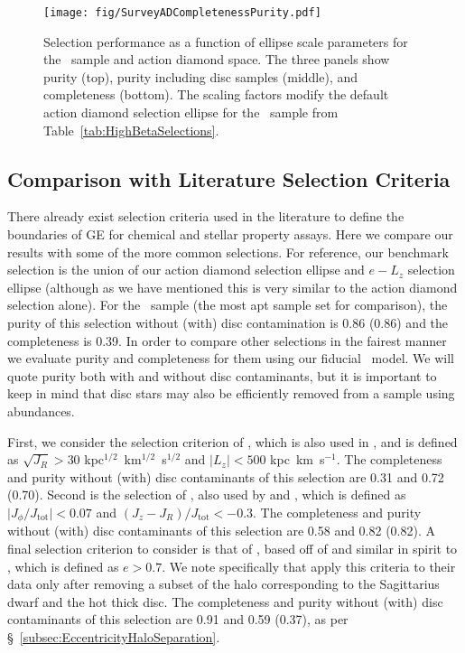 \begin{figure}
    \centering
    \texttt{[image: fig/SurveyADCompletenessPurity.pdf]}
    \caption{Selection performance as a function of ellipse scale parameters for the \survey\ sample and action diamond space. The three panels show purity (top), purity including disc samples (middle), and completeness (bottom). The scaling factors modify the default action diamond selection ellipse for the \survey\ sample from Table~\ref{tab:HighBetaSelections}.}
    \label{fig:SurveyADCompletenessPurity}
\end{figure}


\subsection{Comparison with Literature Selection Criteria}

There already exist selection criteria used in the literature to define the boundaries of GE for chemical and stellar property assays. Here we compare our results with some of the more common selections. For reference, our benchmark selection is the union of our action diamond selection ellipse and $e-L_{z}$ selection ellipse (although as we have mentioned this is very similar to the action diamond selection alone). For the \survey\ sample (the most apt sample set for comparison), the purity of this selection without (with) disc contamination is 0.86 (0.86) and the completeness is 0.39. In order to compare other selections in the fairest manner we evaluate purity and completeness for them using our fiducial \survey\ model. We will quote purity both with and without disc contaminants, but it is important to keep in mind that disc stars may also be efficiently removed from a sample using abundances.

First, we consider the selection criterion of \citet{feuillet20}, which is also used in \citet{matsuno21}, and is defined as $\sqrt{J_{R}} > 30$ kpc$^{1/2}$~km$^{1/2}$~s$^{1/2}$ and $\lvert L_{z} \rvert < 500$ kpc~km~s$^{-1}$. The completeness and purity without (with) disc contaminants of this selection are 0.31 and 0.72 (0.70). Second is the selection of \citet{myeong19}, also used by \citet{monty20} and \citet{cordoni20}, which is defined as $\lvert J_{\phi}/J_\mathrm{tot} \rvert < 0.07$ and $(J_{z}-J_{R})/J_\mathrm{tot} < -0.3$. The completeness and purity without (with) disc contaminants of this selection are 0.58 and 0.82 (0.82). A final selection criterion to consider is that of \citet{naidu20}, based off of \citet{belokurov18} and similar in spirit to \citet{mackereth20}, which is defined as $e>0.7$. We note specifically that \citet{naidu20} apply this criteria to their data only after removing a subset of the halo corresponding to the Sagittarius dwarf and the hot thick disc. The completeness and purity without (with) disc contaminants of this selection are 0.91 and 0.59 (0.37), as per \S~\ref{subsec:EccentricityHaloSeparation}.

